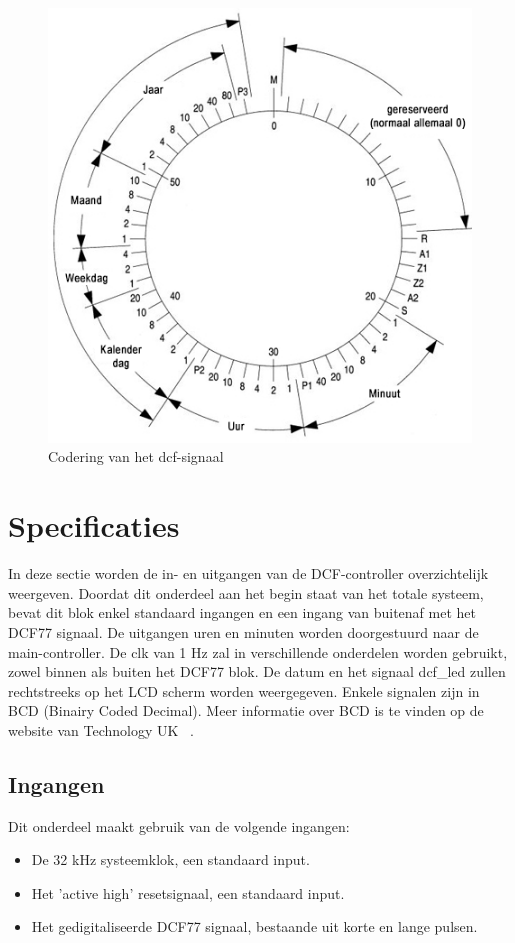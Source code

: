 \begin{figure}[h!]
\center
\includegraphics[scale=1.9]{Figuren/DCF77/dcf77coding.png}
\caption{Codering van het dcf-signaal~\cite{Tijdscodering}}
\label{fig:dcfsignaal}
\end{figure}

\section{Specificaties}
In deze sectie worden de in- en uitgangen van de DCF-controller overzichtelijk weergeven. Doordat dit onderdeel aan het begin staat van het totale systeem, bevat dit blok enkel standaard ingangen en een ingang van buitenaf met het DCF77 signaal. De uitgangen uren en minuten worden doorgestuurd naar de main-controller. De clk van 1 Hz zal in verschillende onderdelen worden gebruikt, zowel binnen als buiten het DCF77 blok. De datum en het signaal dcf\_led zullen rechtstreeks op het LCD scherm worden weergegeven. Enkele signalen zijn in BCD (Binairy Coded Decimal). Meer informatie over BCD is te vinden op de website van Technology UK ~\cite{BCDinfo}.

\subsection{Ingangen}
Dit onderdeel maakt gebruik van de volgende ingangen: 
\begin{itemize}[nolistsep]
\item De 32 kHz systeemklok, een standaard input.
\item Het 'active high' resetsignaal, een standaard input.
\item Het gedigitaliseerde DCF77 signaal, bestaande uit korte en lange pulsen.
\end{itemize}
\noindent

